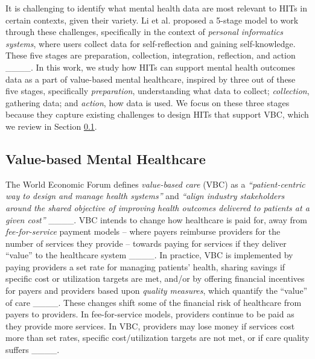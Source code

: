 It is challenging to identify what mental health data are most relevant to HITs in certain contexts, given their variety.
Li et al. proposed a 5-stage model to work through these challenges, specifically in the context of \textit{personal informatics systems}, where users collect data for self-reflection and gaining self-knowledge.
These five stages are preparation, collection, integration, reflection, and action ____.
In this work, we study how HITs can support mental health outcomes data as a part of value-based mental healthcare, inspired by three out of these five stages, specifically \textit{preparation}, understanding what data to collect; \textit{collection}, gathering data; and \textit{action}, how data is used.
We focus on these three stages because they capture existing challenges to design HITs that support VBC, which we review in Section \ref{sec:rw:vbc}.

\subsection{Value-based Mental Healthcare}
\label{sec:rw:vbc}
The World Economic Forum defines \textit{value-based care} (VBC) as a \textit{``patient-centric way to design and manage health systems''} and \textit{``align industry stakeholders around the shared objective of improving health outcomes delivered to patients at a given cost''} ____.
VBC intends to change how healthcare is paid for, away from \textit{fee-for-service} payment models -- where payers reimburse providers for the number of services they provide -- towards paying for services if they deliver ``value'' to the healthcare system ____.
In practice, VBC is implemented by paying providers a set rate for managing patients' health, sharing savings if specific cost or utilization targets are met, and/or by offering financial incentives for payers and providers based upon \textit{quality measures}, which quantify the ``value'' of care ____.
These changes shift some of the financial risk of healthcare from payers to providers.
In fee-for-service models, providers continue to be paid as they provide more services.
In VBC, providers may lose money if services cost more than set rates, specific cost/utilization targets are not met, or if care quality suffers ____.

